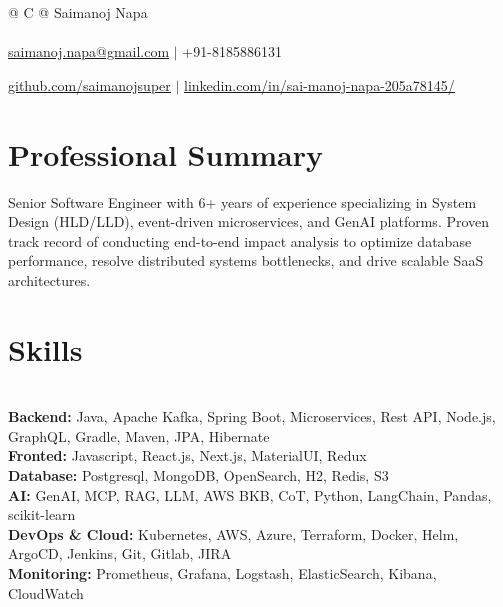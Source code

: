\documentclass[a4paper,8pt]{article}
\begin{document}
\pagestyle{empty} 


\begin{tabularx}{\linewidth}{@{} C @{}}
\color[HTML]{1C033C} \Huge{Saimanoj Napa} \\[6pt]
\\
\textcolor[HTML]{371e77}{\href{mailto:saimanoj.napa@gmail.com}{{\faEnvelope} saimanoj.napa@gmail.com} $|$}
\textcolor[HTML]{371e77}{{{\faMobile} +91-8185886131}}

\textcolor[HTML]{371e77}{\href{https://github.com/saimanojsuper}{\underline{\raisebox{-0.05\height}{\faGithub} github.com/saimanojsuper}} $|$}
\textcolor[HTML]{371e77}{\href{https://linkedin.com/in/sai-manoj-napa-205a78145/}{\underline{\raisebox{-0.05\height}{\faLinkedin} linkedin.com/in/sai-manoj-napa-205a78145/}}}
\end{tabularx}

\color[HTML]{0000FF}\section{Professional Summary}
\color[HTML]{1C033C} Senior Software Engineer with 6+ years of experience specializing in System Design (HLD/LLD), event-driven microservices, and GenAI platforms. Proven track record of conducting end-to-end impact analysis to optimize database performance, resolve distributed systems bottlenecks, and drive scalable SaaS architectures.\\[5pt]

\color[HTML]{0000FF}\section{Skills}
\textbf \\ %
\color[HTML]{1C033C}\textbf{Backend:} Java, Apache Kafka, Spring Boot,  Microservices, Rest API, Node.js, GraphQL, Gradle, Maven, JPA, Hibernate\\[3pt]
\color[HTML]{1C033C}\textbf{Fronted:} Javascript, React.js, Next.js, MaterialUI, Redux \\[3pt]
\color[HTML]{1C033C}\textbf{Database:} Postgresql, MongoDB, OpenSearch, H2, Redis, S3\\[3pt]
\color[HTML]{1C033C}\textbf{AI:} GenAI, MCP, RAG, LLM, AWS BKB, CoT, Python, LangChain, Pandas, scikit-learn\\[3pt]
\color[HTML]{1C033C}\textbf{DevOps \& Cloud:} Kubernetes, AWS, Azure, Terraform, Docker, Helm, ArgoCD, Jenkins, Git, Gitlab, JIRA\\[3pt]
\color[HTML]{1C033C}\textbf{Monitoring:} Prometheus, Grafana, Logstash, ElasticSearch, Kibana, CloudWatch\\[3pt]
\end{document}
